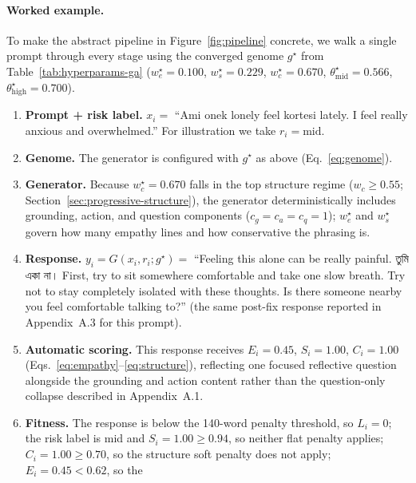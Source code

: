 \documentclass[mathematics,article,xetex,moreauthors]{Definitions/mdpi}
\begin{document}
\paragraph{Worked example.} To make the abstract pipeline in
Figure~\ref{fig:pipeline} concrete, we walk a single prompt through every
stage using the converged genome $g^{\star}$ from Table~\ref{tab:hyperparams-ga}
($w_e^{\star}=0.100$, $w_s^{\star}=0.229$, $w_c^{\star}=0.670$,
$\theta_{\mathrm{mid}}^{\star}=0.566$, $\theta_{\mathrm{high}}^{\star}=0.700$).

\begin{enumerate}
  \item \textbf{Prompt + risk label.} $x_i = $ ``Ami onek lonely feel kortesi
        lately. I feel really anxious and overwhelmed.'' For illustration we
        take $r_i = \mathrm{mid}$.
  \item \textbf{Genome.} The generator is configured with $g^{\star}$ as
        above (Eq.~\eqref{eq:genome}).
  \item \textbf{Generator.} Because $w_c^{\star}=0.670$ falls in the top
        structure regime ($w_c \ge 0.55$; Section~\ref{sec:progressive-structure}),
        the generator deterministically includes grounding, action, and
        question components ($c_g=c_a=c_q=1$); $w_e^{\star}$ and
        $w_s^{\star}$ govern how many empathy lines and how conservative the
        phrasing is.
  \item \textbf{Response.} $y_i = G(x_i,r_i;g^{\star}) = $ ``Feeling this
        alone can be really painful. {\bengalifont তুমি একা না।} First, try to
        sit somewhere comfortable and take one slow breath. Try not to stay
        completely isolated with these thoughts. Is there someone nearby you
        feel comfortable talking to?'' (the same post-fix response reported
        in Appendix~A.3 for this prompt).
  \item \textbf{Automatic scoring.} This response receives
        $E_i = 0.45$, $S_i = 1.00$, $C_i = 1.00$
        (Eqs.~\eqref{eq:empathy}--\eqref{eq:structure}), reflecting one
        focused reflective question alongside the grounding and action
        content rather than the question-only collapse described in
        Appendix~A.1.
  \item \textbf{Fitness.} The response is below the 140-word penalty
        threshold, so $L_i=0$; the risk label is mid and $S_i=1.00 \ge 0.94$,
        so neither flat penalty applies; $C_i=1.00 \ge 0.70$, so the
        structure soft penalty does not apply; $E_i=0.45 < 0.62$, so the

\end{enumerate}
\end{document}

